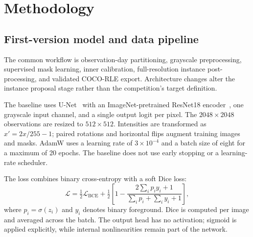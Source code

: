 \documentclass[sigconf]{acmart}
\begin{document}
\section{Methodology}\label{sec:methodology}

\subsection{First-version model and data pipeline}
The common workflow is observation-day partitioning, grayscale preprocessing,
supervised mask learning, inner calibration, full-resolution instance
post-processing, and validated COCO-RLE export. Architecture changes alter
the instance proposal stage rather than the competition's target definition.

The baseline uses U-Net~\cite{unet} with an ImageNet-pretrained ResNet18
encoder~\cite{resnet}, one grayscale input channel, and a single output
logit per pixel. The $2048\times2048$ observations are resized to
$512\times512$. Intensities are transformed as
$x'=2x/255-1$; paired rotations and horizontal flips augment training
images and masks. AdamW uses a learning rate of $3\times10^{-4}$ and a
batch size of eight for a maximum of 20 epochs. The baseline does not
use early stopping or a learning-rate scheduler.

The loss combines binary cross-entropy with a soft Dice loss:
\begin{equation}
 \mathcal{L}=\tfrac12\mathcal{L}_{\mathrm{BCE}}+
 \tfrac12\left[1-\frac{2\sum_i p_i y_i+1}
 {\sum_i p_i+\sum_i y_i+1}\right],
\end{equation}
where $p_i=\sigma(z_i)$ and $y_i$ denotes binary foreground.
Dice is computed per image and averaged across the batch.
The output head has no activation; sigmoid is applied explicitly,
while internal nonlinearities remain part of the network.
\end{document}
